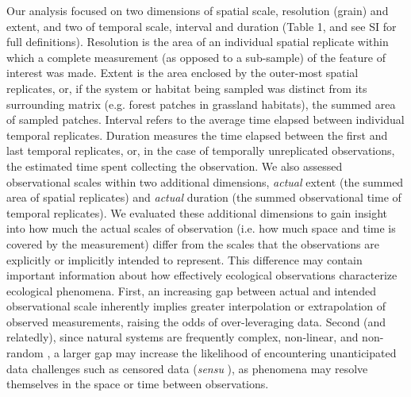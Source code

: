 \documentclass[12pt]{article}
\begin{document}
Our analysis focused on two dimensions of spatial scale, resolution (grain) and extent, and two of temporal scale, interval and duration (Table 1, and see SI for full definitions). Resolution is the area of an individual spatial replicate within which a complete measurement (as opposed to a sub-sample) of the feature of interest was made. Extent is the area enclosed by the outer-most spatial replicates, or, if the system or habitat being sampled was distinct from its surrounding matrix (e.g. forest patches in grassland habitats), the summed area of sampled patches. Interval refers to the average time elapsed between individual temporal replicates. Duration measures the time elapsed between the first and last temporal replicates, or, in the case of temporally unreplicated observations, the estimated time spent collecting the observation. We also assessed observational scales within two additional dimensions, \emph{actual} extent (the summed area of spatial replicates) and \emph{actual} duration (the summed observational time of temporal replicates). We evaluated these additional dimensions to gain insight into how much the actual scales of observation (i.e. how much space and time is covered by the measurement) differ from the scales that the observations are explicitly or implicitly intended to represent. This difference may contain important information about how effectively ecological observations characterize ecological phenomena. First, an increasing gap between actual and intended observational scale inherently implies greater interpolation or extrapolation of observed measurements, raising the odds of over-leveraging data. Second (and relatedly), since natural systems are frequently complex, non-linear, and non-random \cite{levin_ecosystems_1998,pringle_spatial_2017,rietkerk_regular_2008}, a larger gap may increase the likelihood of encountering unanticipated data challenges such as censored data (\emph{sensu} \cite{efron_efficiency_1977}), as phenomena may resolve themselves in the space or time between observations. 
\end{document}

